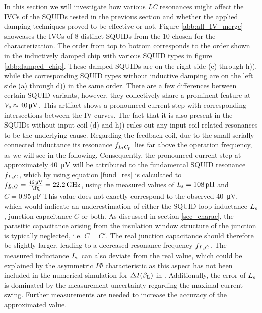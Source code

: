In this section we will investigate how various \textit{LC} resonances might affect the IVCs of the SQUIDs tested in the previous section and whether the applied damping techniques proved to be effective or not. Figure \ref{abb:all_IV_merge} showcases the IVCs of 8 distinct SQUIDs from the 10 chosen for the characterization. The order from top to bottom corresponds to the order shown in the inductively damped chip with various SQUID types in figure \ref{abb:damped_chip}. These damped SQUIDs are on the right side (e) through h)), while the corresponding SQUID types without inductive damping are on the left side (a) through d)) in the same order. There are a few differences between certain SQUID variants, however, they collectively share a prominent feature at $V_{\rm s}\approx\qty{40}{\uV}$. This artifact shows a pronounced current step with corresponding intersections between the IV curves. The fact that it is also present in the SQUIDs without input coil (d) and h)) rules out any input coil related resonances to be the underlying cause. Regarding the feedback coil, due to the small serially connected inductance its resonance $f_{L_{\rm f}C_{\rm p}}$ lies far above the operation frequency, as we will see in the following. Consequently, the pronounced current step at approximately \qty{40}{\uV} will be attributed to the fundamental SQUID resonance $f_{L_{\rm s}C}$, which by using equation \ref{fund_res} is calculated to $f_{L_{\rm s}C}=\frac{\qty{46}{\uV}}{\unit{\fq}}=\qty{22.2}{\GHz}$, using the measured values of $L_{\rm s}=\qty{108}{\pH}$ and $C=\qty{0.95}{\pF}$ This value does not exactly correspond to the observed \qty{40}{\uV}, which would indicate an underestimation of either the SQUID loop inductance $L_{\rm s}$, junction capacitance $C$ or both. As discussed in section \ref{sec_charac}, the parasitic capacitance arising from the insulation window structure of the junction is typically neglected, i.e. $C=C'$. The real junction capacitance should therefore be slightly larger, leading to a decreased resonance frequency $f_{L_{\rm s}C}$. The measured inductance $L_{\rm s}$ can also deviate from the real value, which could be explained by the asymmetric $I\Phi$ characteristic as this aspect has not been included in the numerical simulation for $\Delta I(\beta_{\rm L})$ in \cite{Tesche1977}. Additionally, the error of $L_{\rm s}$ is dominated by the measurement uncertainty regarding the maximal current swing. Further measurements are needed to increase the accuracy of the approximated value.\\

